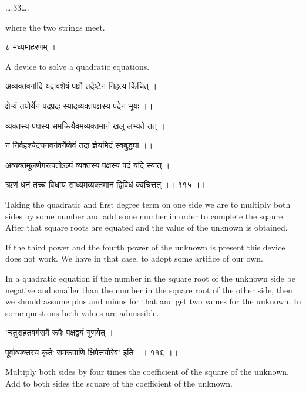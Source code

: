 \documentclass[]{article}
\date{}
\begin{document}
{\ldots{}.33\ldots{}.}

{where the two strings meet.}

{८ मध्यमाहरणम् । }

{A device to solve a quadratic equations. }

{अव्यक्तवर्गादि यदावशेषं पक्षौ तदेष्टेन निहत्य किंचित् । }

{क्षेप्यं तयोर्येन पदप्रदः स्यादव्यक्तपक्षस्य पदेन भूयः ।। }

{व्यक्तस्य पक्षस्य समक्रियैवमव्यक्तमानं खलु लभ्यते तत् । }

{न निर्वहश्चेदघनवर्गवर्गेष्वेवं तदा ज्ञेयमिदं स्वबुद्ध्या ।। }

{अव्यक्तमूलर्णगरूपतोऽल्पं व्यक्तस्य पक्षस्य पदं यदि स्यात् । }

{ऋणं धनं तच्च विधाय साध्यमव्यक्तमानं द्विविधं क्वचित्तत् ।। ११५ ।। }

{Taking the quadratic and first degree term on one side we are to
multiply both sides by some number and add some number in order to
complete the sqaure. After that square roots are equated and the value
of the unknown is obtained.}

{If the third power and the fourth power of the unknown is present this
device does not work. We have in that case, to adopt some artifice of
our own.}

{In a quadratic equation if the number in the square root of the unknown
side be negative and smaller than the number in the square root of the
other side, then we should assume plus and minus for that and get two
values for the unknown. In some questions both values are admissible.}

{'चतुराहतवर्गसमै रूपैः पक्षद्वयं गुणयेत् । }

{पूर्वाव्यक्तस्य कृतेः समरूपाणि क्षिपेत्तयोरेव' इति ।। ११६ ।। }

{Multiply both sides by four times the coefficient of the square of the
unknown. Add to both sides the square of the coefficient of the
unknown.\\
}
\end{document}
